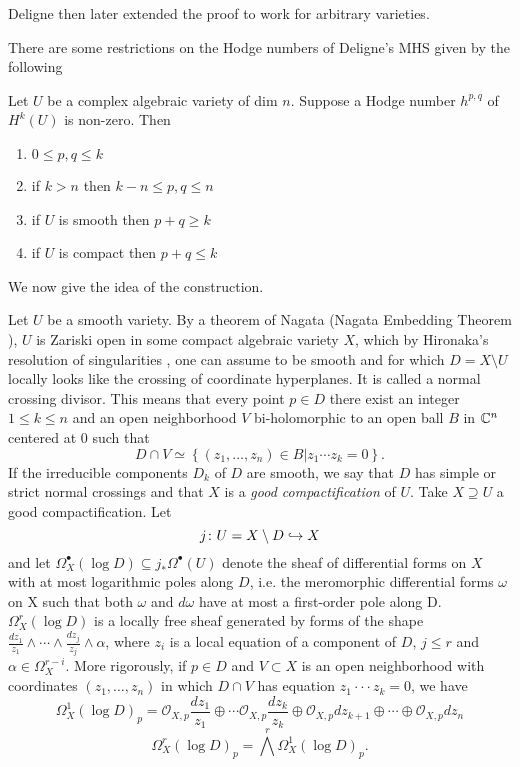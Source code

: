 \documentclass[../main.tex]{subfiles}
\begin{document}
Deligne then later extended the proof to work for arbitrary varieties. 

There are some restrictions on the Hodge numbers of Deligne's MHS given by the following 
\begin{theorem}\textup{\cite[Thm. 5.39]{PS08}}
\label{deligne-numbers}
Let $U$ be a complex algebraic variety of dim $n$. Suppose a Hodge number $h^{p,q}$ of $H^k(U)$ is non-zero. Then
\begin{enumerate}
\item $0 \le p,q \le k$
\item if $k > n $ then $k-n \le p,q \le n$ 
\item if $U$ is smooth then $p+q \geq k$
\item if $U$ is compact then $p+q \le k$

\end{enumerate}

\end{theorem}


We now give the idea of the construction.

Let $U$ be a smooth variety. By a theorem of Nagata (Nagata Embedding Theorem \cite{Del10}), $U$ is Zariski open in some compact algebraic variety $X$, which by Hironaka's resolution of
singularities \cite{Wlo05}, one can assume to be smooth and for which $D = X \setminus U$ locally looks like the crossing of coordinate hyperplanes. It is called a normal crossing divisor. This means that every point $p \in D$ there exist an integer $1 \leq k \leq n$ and an open neighborhood $V$ bi-holomorphic to an open ball $B$ in $\mathbb{C}^n$ centered at $0$ such that
\[
D \cap V \simeq \left\{ (z_1,\dots , z_n) \in B | z_1 \cdots z_k = 0 \right\}.
\]
If the irreducible components $D_k$ of $D$ are smooth, we say that $D$ has simple or strict normal
crossings and that $X$ is a \emph{good compactification} of $U$. Take $X\supseteq U$ a good compactification. Let
\[j \colon U = X \setminus D \hookrightarrow X
\]and let $\Omega^\bullet_X(\log D) \subseteq j_*\Omega^\bullet(U)$ denote the sheaf of differential forms on $X$ with at most logarithmic poles along $D$, i.e. the meromorphic differential forms $\omega$ on X
such that both $\omega$ and $d\omega$ have at most a first-order pole along D. $\Omega^r_X(\log D)$ is a locally free sheaf generated by forms of the shape
$\frac{dz_1}{z_1}\wedge\cdots\wedge\frac{dz_j}{z_j}\wedge \alpha$, where $z_i$ is a local equation of a component of $D$, $j\le r$ and $\alpha\in\Omega^{r-i}_X$. More rigorously, if $p \in D$ and $V \subset X$ is an open neighborhood with coordinates $(z_1,\dots,z_n)$ in which $D \cap V$ has equation $z_1 \cdot\cdot\cdot z_k = 0$, we have
\[
 \Omega_X^1(\log D)_p=\mathcal{O}_{X, p} \frac{d z_1}{z_1} \oplus \cdots \mathcal{O}_{X, p} \frac{d z_k}{z_k} \oplus \mathcal{O}_{X, p} d z_{k+1} \oplus \cdots \oplus \mathcal{O}_{X, p} d z_n \]
\[
 \Omega_X^r(\log D)_p=\bigwedge^r \Omega_X^1(\log D)_p.
\]
\end{document}
